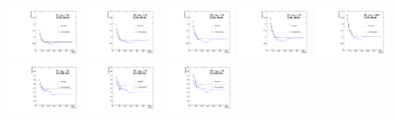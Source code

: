 \begin{figure}[!htbp]
\centering
\includegraphics[width=0.19\textwidth]{fig/compare_pv_EB_2018_0to22.pdf}
\includegraphics[width=0.19\textwidth]{fig/compare_pv_EB_2018_23to27.pdf}
\includegraphics[width=0.19\textwidth]{fig/compare_pv_EB_2018_28to32.pdf}
\includegraphics[width=0.19\textwidth]{fig/compare_pv_EB_2018_33to37.pdf}
\includegraphics[width=0.19\textwidth]{fig/compare_pv_EB_2018_38to200.pdf}\\
\includegraphics[width=0.19\textwidth]{fig/compare_pv_EE1_2018_0to22.pdf}
\includegraphics[width=0.19\textwidth]{fig/compare_pv_EE1_2018_23to27.pdf}
\includegraphics[width=0.19\textwidth]{fig/compare_pv_EE1_2018_28to32.pdf}

\end{figure}
